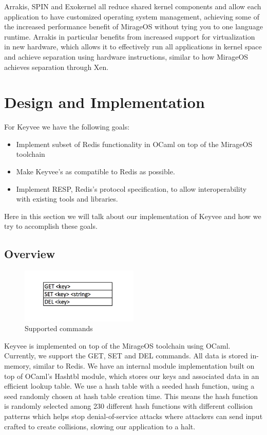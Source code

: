 \documentclass[english,10pt,twocolumn]{article}
\begin{document}
Arrakis\cite{arrakis}, SPIN\cite{spin} and Exokernel\cite{exokernel} all reduce shared kernel components and allow each application to have customized operating system management, achieving some of the increased performance benefit of MirageOS without tying you to one language runtime.
Arrakis in particular benefits from increased support for virtualization in new hardware, which allows it to effectively run all applications in kernel space and achieve separation using hardware instructions, similar to how MirageOS achieves separation through Xen.

\section{Design and Implementation}
For Keyvee we have the following goals:
\begin{itemize}
  \item Implement subset of Redis functionality in OCaml on top of the MirageOS toolchain
  \item Make Keyvee's as compatible to Redis as possible.
  \item Implement RESP, Redis's protocol specification, to allow interoperability with existing tools and libraries.
\end{itemize}

Here in this section we will talk about our implementation of Keyvee and how we try to accomplish these goals.

\subsection{Overview}

\begin{figure}[ht]
  \centering
  \caption{Supported commands}
  \includegraphics[width=0.5\textwidth]{images/commands}
\end{figure}

Keyvee is implemented on top of the MirageOS toolchain using OCaml.
Currently, we support the GET, SET and DEL commands.
All data is stored in-memory, similar to Redis.
We have an internal module implementation built on top of OCaml's Hashtbl module, which stores our keys and associated data in an efficient lookup table.
We use a hash table with a seeded hash function, using a seed randomly chosen at hash table creation time.
This means the hash function is randomly selected among 230 different hash functions with different collision patterns which helps stop denial-of-service attacks where attackers can send input crafted to create collisions, slowing our application to a halt.
\end{document}
